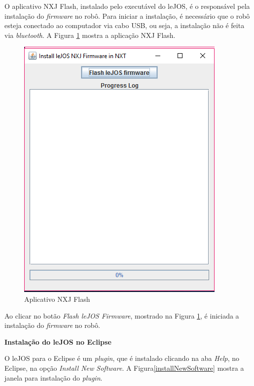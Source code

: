 	O aplicativo NXJ Flash, instalado pelo executável do leJOS, é o responsável pela instalação do \textit{firmware} no robô. Para iniciar a instalação, é necessário que o robô esteja conectado ao computador via cabo USB, ou seja, a instalação não é feita via \textit{bluetooth}.  
\clearpage
	A Figura \ref{lejosFirmware} mostra a aplicação NXJ Flash.
\FloatBarrier
\begin{figure}[!h]
\centering
\includegraphics[keepaspectratio=true,scale=0.7]{figuras/lejosFirmware.png}
\caption{Aplicativo NXJ Flash}
\label{lejosFirmware}
\end{figure}
	Ao clicar no botão \textit{Flash leJOS Firmware}, mostrado na Figura \ref{lejosFirmware}, é iniciada a instalação do \textit{firmware} no robô.
	
	\textbf{Instalação do leJOS no Eclipse}
	
	O leJOS para o Eclipse é um \textit{plugin}, que é instalado clicando na aba \textit{Help}, no Eclipse, na opção \textit{Install New Software}. A Figura\ref{installNewSoftware} mostra a janela para instalação do \textit{plugin}. 


